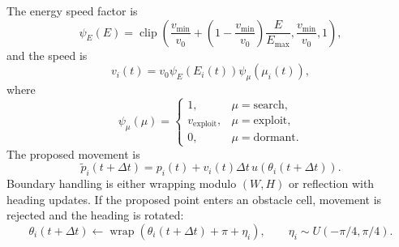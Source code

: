 \documentclass[11pt]{article}
\begin{document}
The energy speed factor is
\begin{equation}
  \psi_E(E)=\operatorname{clip}
  \left(
  \frac{v_{\min}}{v_0}
  +\left(1-\frac{v_{\min}}{v_0}\right)\frac{E}{E_{\max}},
  \frac{v_{\min}}{v_0},1
  \right),
\end{equation}
and the speed is
\begin{equation}
  v_i(t)=v_0\psi_E(E_i(t))\psi_\mu(\mu_i(t)),
\end{equation}
where
\begin{equation}
  \psi_\mu(\mu)=
  \begin{cases}
  1, & \mu=\mathrm{search},\\
  v_{\mathrm{exploit}}, & \mu=\mathrm{exploit},\\
  0, & \mu=\mathrm{dormant}.
  \end{cases}
\end{equation}
The proposed movement is
\begin{equation}
  \tilde p_i(t+\Delta t)=p_i(t)+v_i(t)\Delta t\,u(\theta_i(t+\Delta t)).
\end{equation}
Boundary handling is either wrapping modulo $(W,H)$ or reflection with heading
updates. If the proposed point enters an obstacle cell, movement is rejected and
the heading is rotated:
\begin{equation}
  \theta_i(t+\Delta t)\leftarrow
  \operatorname{wrap}\left(\theta_i(t+\Delta t)+\pi+\eta_i\right),
  \qquad \eta_i\sim U(-\pi/4,\pi/4).
\end{equation}
\end{document}
